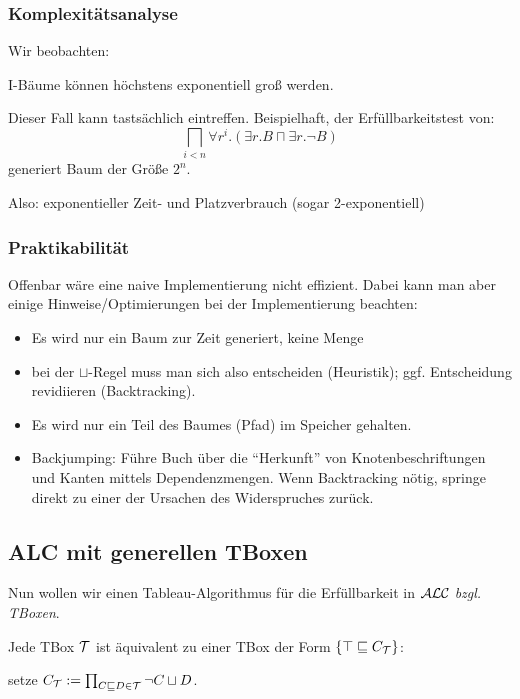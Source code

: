 \subsubsection{Komplexitätsanalyse}\label{praktikabilituxe4t}

Wir beobachten: 

I-Bäume können höchstens exponentiell groß werden.

Dieser Fall kann tastsächlich eintreffen. Beispielhaft, der Erfüllbarkeitstest von:
$$\bigsqcap_{i < n} \forall r^i .(\exists r.B \sqcap \exists r.\neg B)$$
generiert Baum der Größe $2^n$.

Also: exponentieller Zeit- und Platzverbrauch (sogar 2-exponentiell)

\subsubsection{Praktikabilität}

Offenbar wäre eine naive Implementierung nicht effizient. Dabei kann man aber einige Hinweise/Optimierungen bei der Implementierung beachten:

\begin{itemize}
	\item Es wird nur ein Baum zur Zeit generiert, keine Menge
	\item bei der $\sqcup$-Regel muss man sich also entscheiden (Heuristik); ggf. Entscheidung revidiieren (Backtracking).
	\item Es wird nur ein Teil des Baumes (Pfad) im Speicher gehalten.
	\item Backjumping: Führe Buch über die ``Herkunft'' von Knotenbeschriftungen und Kanten mittels Dependenzmengen. Wenn Backtracking nötig, springe direkt zu einer der Ursachen des Widerspruches zurück.
\end{itemize}

\subsection{ALC mit generellen TBoxen}\label{alc-mit-generellen-tboxen}

Nun wollen wir einen Tableau-Algorithmus für die Erfüllbarkeit in $\mathcal{A}\mathcal{L}\mathcal{C}$  \emph{bzgl. TBoxen}.

Jede TBox $\mathcal{T}$ ist äquivalent zu einer TBox der Form
$\left\{ \top \sqsubseteq C_{\mathcal{T}} \right\}$: 

\begin{center}setze $C_{\mathcal{T}} := \prod_{C \sqsubseteq D \in \mathcal{T}}^{}{\neg C \sqcup D}$.\end{center}

